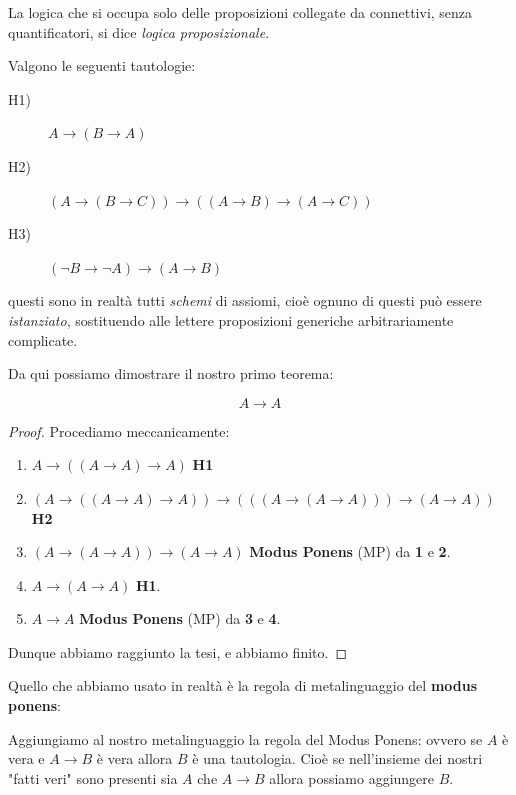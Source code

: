 \documentclass[11pt]{scrartcl}
\begin{document}
	La logica che si occupa solo delle proposizioni collegate da connettivi, senza quantificatori, si dice \textit{logica proposizionale}.
	\begin{definition}
		Valgono le seguenti tautologie:
		\begin{description}
			\item[H1)] $A\to ( B \to A)$ 
			\item[H2)] $\left(A\to \left(B\to C\right) \right) \to \left(\left(A\to B\right) \to \left(A \to C\right)\right)$
			\item[H3)] $\left(\lnot B \to \lnot A\right) \to \left(A \to B\right)$
		\end{description}
		questi sono in realtà tutti \textit{schemi} di assiomi, cioè ognuno di questi può essere \textit{istanziato}, sostituendo alle lettere proposizioni generiche arbitrariamente complicate. 
	\end{definition}
	Da qui possiamo dimostrare il nostro primo teorema:
	\begin{theorem}
		$$A\to A$$
	\end{theorem}
	\begin{proof}
		Procediamo meccanicamente:
		\begin{enumerate}
			\item $A\to \left(\left(A\to A\right)\to A\right)$ \textbf{H1}
			\item $\left(A\to \left(\left(A\to A\right)\to A\right)\right)\to \left(\left(\left(A\to \left(A\to A\right)\right)\right)\to \left(A\to A\right)\right)$ \textbf{H2}
			\item $\left(A\to \left(A\to A\right)\right)\to \left(A\to A\right)$ \textbf{Modus Ponens} (MP) da \textbf{1} e \textbf{2}.
			\item $A\to \left(A\to A\right)$ \textbf{H1}.
			\item  $A\to A$ \textbf{Modus Ponens} (MP) da \textbf{3} e \textbf{4}.
		\end{enumerate}
		Dunque abbiamo raggiunto la tesi, e abbiamo finito.
	\end{proof}
	Quello che abbiamo usato in realtà è la regola di metalinguaggio del \textbf{modus ponens}:
	\begin{definition}
		Aggiungiamo al nostro metalinguaggio la regola del Modus Ponens: ovvero se $A$ è vera e $A\to B$ è vera allora $B$ è una tautologia. Cioè se nell'insieme dei nostri "fatti veri" sono presenti sia $A$ che $A\to B$ allora possiamo aggiungere $B$.
	\end{definition}
\end{document}
